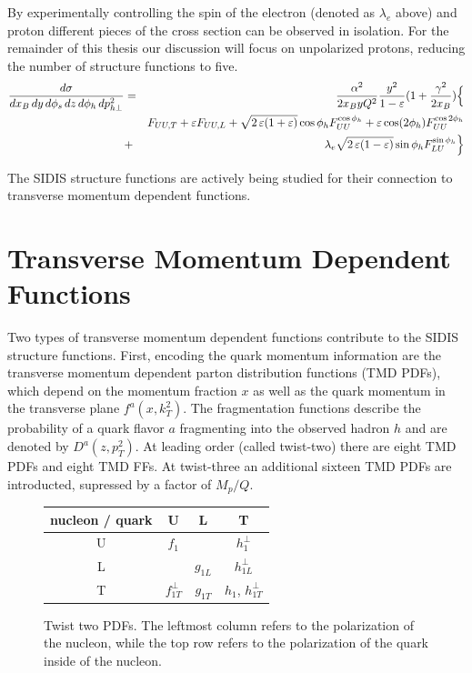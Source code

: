 By experimentally controlling the spin of the electron (denoted as $\lambda_e$ above) and proton different pieces of the cross section can be observed in isolation.  For the remainder of this thesis our discussion will focus on unpolarized protons, reducing the number of structure functions to five.  
\begin{eqnarray}
\frac{d\sigma}{dx_B \, dy\, d\phi_s \,dz\, d\phi_h\, d p_{h\perp}^2}
&=&\frac{\alpha^2}{2x_B y Q^2}
\frac{y^2}{1-\varepsilon}  ( 1+\frac{\gamma^2}{2x_B} ) \Bigl\{  \nonumber \\
&& F_{UU ,T} +  \varepsilon F_{UU ,L}
+ \sqrt{2\,\varepsilon (1+\varepsilon)} \cos\phi_h F_{UU}^{\cos\phi_h}
+ \varepsilon \cos(2\phi_h) F_{UU}^{\cos 2\phi_h} \nonumber \\
&+& \lambda_e
\sqrt{2\,\varepsilon (1-\varepsilon)} \sin\phi_h F_{LU}^{\sin\phi_h}\Bigr\}
\end{eqnarray}

The SIDIS structure functions are actively being studied for their connection to transverse momentum dependent functions.

\section{Transverse Momentum Dependent Functions}
Two types of transverse momentum dependent functions contribute to the SIDIS structure functions.  First, encoding the quark momentum information are the transverse momentum dependent parton distribution functions (TMD PDFs), which depend on the momentum fraction $x$ as well as the quark momentum in the transverse plane $f^{a}(x, k_{T}^{2})$.  The fragmentation functions describe the probability of a quark flavor $a$ fragmenting into the observed hadron $h$ and are denoted by $D^{a}(z, p_{T}^{2})$.  At leading order (called twist-two) there are eight TMD PDFs and eight TMD FFs.  At twist-three an additional sixteen TMD PDFs are introducted, supressed by a factor of $M_p/Q$.

\begin{figure}
	\centering
	\begin{tabular}{|c|c|c|c|}
		\hline 
		nucleon / quark & U & L & T \\
		\hline
		U & $f_1$ & & $h_1^{\perp}$ \\
		L & & $g_{1L}$ & $h_{1L}^{\perp}$ \\
		T & $f_{1T}^{\perp}$ & $g_{1T}$ & $h_1$, $h_{1T}^{\perp}$ \\ 
		\hline
	\end{tabular}
	\caption[Twist two PDFs]{Twist two PDFs.  The leftmost column refers to the polarization of the nucleon, while the top row refers to the polarization of the quark inside of the nucleon.}
	\label{table:twist-two-pdfs}
\end{figure}

